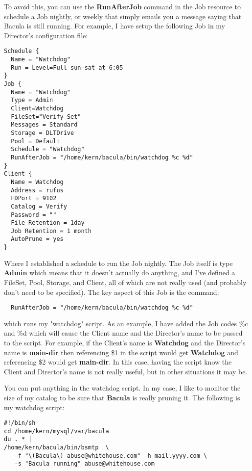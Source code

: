 To avoid this, you can use the {\bf RunAfterJob} command in the Job resource
to schedule a Job nightly, or weekly that simply emails you a message saying
that Bacula is still running. For example, I have setup the following Job in
my Director's configuration file:

\footnotesize
\begin{verbatim}
Schedule {
  Name = "Watchdog"
  Run = Level=Full sun-sat at 6:05
}
Job {
  Name = "Watchdog"
  Type = Admin
  Client=Watchdog
  FileSet="Verify Set"
  Messages = Standard
  Storage = DLTDrive
  Pool = Default
  Schedule = "Watchdog"
  RunAfterJob = "/home/kern/bacula/bin/watchdog %c %d"
}
Client {
  Name = Watchdog
  Address = rufus
  FDPort = 9102
  Catalog = Verify
  Password = ""
  File Retention = 1day
  Job Retention = 1 month
  AutoPrune = yes
}
\end{verbatim}
\normalsize

Where I established a schedule to run the Job nightly. The Job itself is type
{\bf Admin} which means that it doesn't actually do anything, and I've defined
a FileSet, Pool, Storage, and Client, all of which are not really used (and
probably don't need to be specified). The key aspect of this Job is the
command:

\footnotesize
\begin{verbatim}
  RunAfterJob = "/home/kern/bacula/bin/watchdog %c %d"
\end{verbatim}
\normalsize

which runs my "watchdog" script. As an example, I have added the Job codes
\%c and \%d which will cause the Client name and the Director's name to be
passed to the script. For example, if the Client's name is {\bf Watchdog} and
the Director's name is {\bf main-dir} then referencing \$1 in the script would
get {\bf Watchdog} and referencing \$2 would get {\bf main-dir}. In this case,
having the script know the Client and Director's name is not really useful,
but in other situations it may be.

You can put anything in the watchdog script. In my case, I like to monitor the
size of my catalog to be sure that {\bf Bacula} is really pruning it. The
following is my watchdog script:

\footnotesize
\begin{verbatim}
#!/bin/sh
cd /home/kern/mysql/var/bacula
du . * |
/home/kern/bacula/bin/bsmtp  \
   -f "\(Bacula\) abuse@whitehouse.com" -h mail.yyyy.com \
   -s "Bacula running" abuse@whitehouse.com
\end{verbatim}
\normalsize

